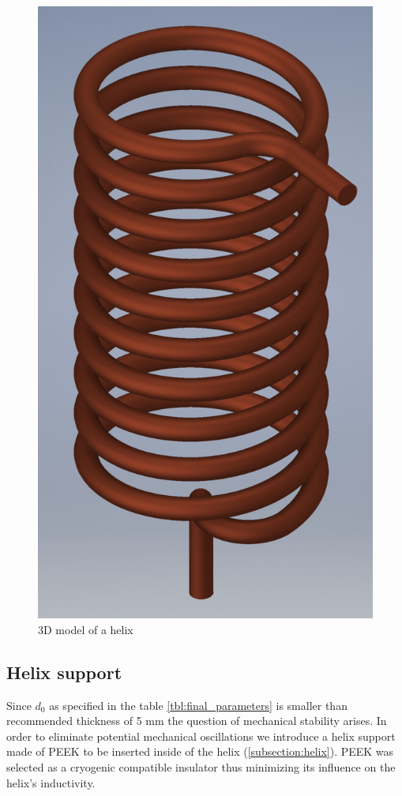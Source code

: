 \begin{figure}[h]
	\centering
	\includegraphics[width=.71\textwidth]{images/coil_small}
	\caption{3D model of a helix}
	\label{fig:helix}
\end{figure}

\clearpage
\subsection{Helix support}
\label{subsection:helix_support}
Since $d_0$ as specified in the table \ref{tbl:final_parameters} is smaller than recommended thickness of 5 mm the question of mechanical stability arises. In order to eliminate potential mechanical oscillations we introduce a helix support made of PEEK to be inserted inside of the helix (\ref{subsection:helix}). PEEK was selected as a cryogenic compatible insulator thus minimizing its influence on the helix's inductivity.

